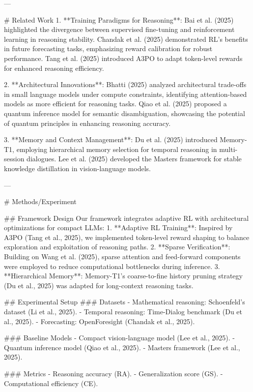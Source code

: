 ---

# Related Work  
1. **Training Paradigms for Reasoning**: Bai et al. (2025) highlighted the divergence between supervised fine-tuning and reinforcement learning in reasoning stability. Chandak et al. (2025) demonstrated RL's benefits in future forecasting tasks, emphasizing reward calibration for robust performance. Tang et al. (2025) introduced A3PO to adapt token-level rewards for enhanced reasoning efficiency.

2. **Architectural Innovations**: Bhatti (2025) analyzed architectural trade-offs in small language models under compute constraints, identifying attention-based models as more efficient for reasoning tasks. Qiao et al. (2025) proposed a quantum inference model for semantic disambiguation, showcasing the potential of quantum principles in enhancing reasoning accuracy.

3. **Memory and Context Management**: Du et al. (2025) introduced Memory-T1, employing hierarchical memory selection for temporal reasoning in multi-session dialogues. Lee et al. (2025) developed the Masters framework for stable knowledge distillation in vision-language models.

---

# Methods/Experiment  

## Framework Design  
Our framework integrates adaptive RL with architectural optimizations for compact LLMs:  
1. **Adaptive RL Training**: Inspired by A3PO (Tang et al., 2025), we implemented token-level reward shaping to balance exploration and exploitation of reasoning paths.  
2. **Sparse Verification**: Building on Wang et al. (2025), sparse attention and feed-forward components were employed to reduce computational bottlenecks during inference.  
3. **Hierarchical Memory**: Memory-T1's coarse-to-fine history pruning strategy (Du et al., 2025) was adapted for long-context reasoning tasks.  

## Experimental Setup  
### Datasets  
- Mathematical reasoning: Schoenfeld's dataset (Li et al., 2025).  
- Temporal reasoning: Time-Dialog benchmark (Du et al., 2025).  
- Forecasting: OpenForesight (Chandak et al., 2025).  

### Baseline Models  
- Compact vision-language model (Lee et al., 2025).  
- Quantum inference model (Qiao et al., 2025).  
- Masters framework (Lee et al., 2025).  

### Metrics  
- Reasoning accuracy (RA).  
- Generalization score (GS).  
- Computational efficiency (CE).  

